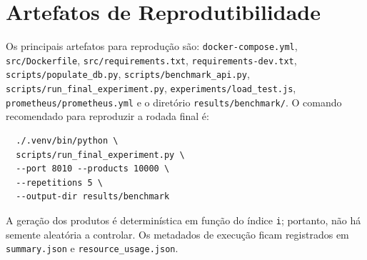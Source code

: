 \documentclass[journal]{IEEEtran}
\begin{document}
\section{Artefatos de Reprodutibilidade}

Os principais artefatos para reprodução são: \texttt{docker-compose.yml}, \texttt{src/Dockerfile}, \texttt{src/requirements.txt}, \texttt{requirements-dev.txt}, \texttt{scripts/populate\_db.py}, \texttt{scripts/benchmark\_api.py}, \texttt{scripts/run\_final\_experiment.py}, \texttt{experiments/load\_test.js}, \texttt{prometheus/prometheus.yml} e o diretório \texttt{results/benchmark/}. O comando recomendado para reproduzir a rodada final é:

\begin{verbatim}
  ./.venv/bin/python \
  scripts/run_final_experiment.py \
  --port 8010 --products 10000 \
  --repetitions 5 \
  --output-dir results/benchmark
\end{verbatim}

A geração dos produtos é determinística em função do índice \texttt{i}; portanto, não há semente aleatória a controlar. Os metadados de execução ficam registrados em \texttt{summary.json} e \texttt{resource\_usage.json}.



\end{document}
